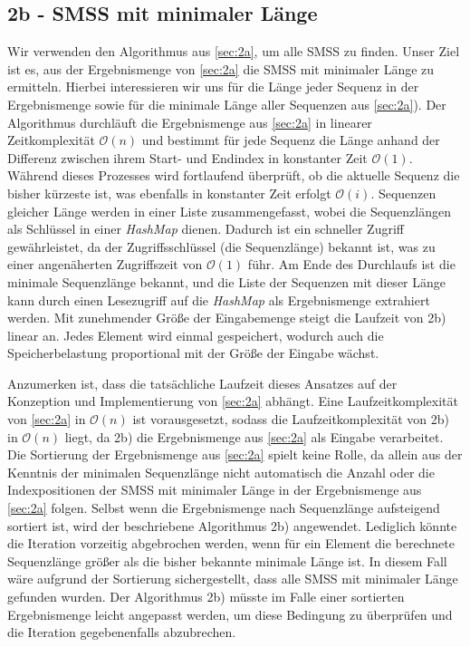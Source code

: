 \documentclass[10pt]{article}
\begin{document}
\subsection{2b - SMSS mit minimaler Länge}\label{sec:2b}
Wir verwenden den Algorithmus aus \ref{sec:2a}, um alle SMSS zu finden. 
Unser Ziel ist es, aus der Ergebnismenge von \ref{sec:2a} die SMSS mit minimaler Länge zu ermitteln. 
Hierbei interessieren wir uns für die Länge jeder Sequenz in der Ergebnismenge sowie für 
die minimale Länge aller Sequenzen aus \ref{sec:2a}).
Der Algorithmus durchläuft die Ergebnismenge aus \ref{sec:2a} in linearer Zeitkomplexität $\mathcal{O}(n)$ 
und bestimmt für jede Sequenz die Länge anhand der Differenz zwischen ihrem Start- und Endindex in 
konstanter Zeit $\mathcal{O}(1)$. Während dieses Prozesses wird fortlaufend überprüft, 
ob die aktuelle Sequenz die bisher kürzeste ist, was ebenfalls in konstanter Zeit erfolgt $\mathcal{O}(i)$. 
Sequenzen gleicher Länge werden in einer Liste zusammengefasst, wobei die Sequenzlängen als Schlüssel 
in einer \textit{HashMap} dienen. Dadurch ist ein schneller Zugriff gewährleistet, 
da der Zugriffsschlüssel (die Sequenzlänge) bekannt ist, was zu einer angenäherten Zugriffszeit von 
$\mathcal{O}(1)$ führ.
Am Ende des Durchlaufs ist die minimale Sequenzlänge bekannt, und die Liste der Sequenzen mit dieser 
Länge kann durch einen Lesezugriff auf die \textit{HashMap} als Ergebnismenge extrahiert werden.
Mit zunehmender Größe der Eingabemenge steigt die Laufzeit von 2b) linear an. 
Jedes Element wird einmal gespeichert, wodurch auch die Speicherbelastung proportional mit der 
Größe der Eingabe wächst.

Anzumerken ist, dass die tatsächliche Laufzeit dieses Ansatzes auf der Konzeption und Implementierung 
von \ref{sec:2a} abhängt. 
Eine Laufzeitkomplexität von \ref{sec:2a} in $\mathcal{O}(n)$ ist vorausgesetzt, sodass die 
Laufzeitkomplexität von 2b) in $\mathcal{O}(n)$ liegt, da 2b) die Ergebnismenge 
aus \ref{sec:2a} als Eingabe verarbeitet.
Die Sortierung der Ergebnismenge aus \ref{sec:2a} spielt keine Rolle, da allein aus der Kenntnis der minimalen 
Sequenzlänge nicht automatisch die Anzahl oder die Indexpositionen der SMSS mit minimaler Länge in 
der Ergebnismenge aus \ref{sec:2a} folgen. 
Selbst wenn die Ergebnismenge nach Sequenzlänge aufsteigend sortiert ist, wird der beschriebene 
Algorithmus 2b) angewendet. Lediglich könnte die Iteration vorzeitig abgebrochen werden, 
wenn für ein Element die berechnete Sequenzlänge größer als die bisher bekannte minimale Länge ist. 
In diesem Fall wäre aufgrund der Sortierung sichergestellt, dass alle SMSS mit minimaler 
Länge gefunden wurden. Der Algorithmus 2b) müsste im Falle einer sortierten Ergebnismenge leicht 
angepasst werden, um diese Bedingung zu überprüfen und die Iteration gegebenenfalls abzubrechen.
\end{document}
